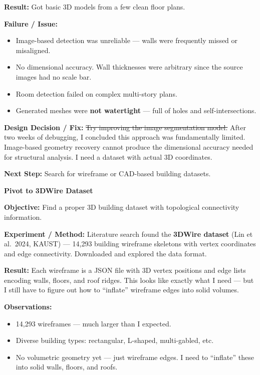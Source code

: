 \documentclass[11pt, letterpaper]{article}
\newcounter{entrynum}
\newcommand{\entry}[2]{%
  \refstepcounter{entrynum}%
  \vspace{6mm}%
  \noindent\begin{tcolorbox}[
    colback=bglight, colframe=entryblue,
    boxrule=1pt, arc=3pt,
    title={\textbf{Entry \theentrynum}\hfill\textbf{#1}},
    fonttitle=\large\color{white},
    colbacktitle=entryblue,
    left=3mm, right=3mm, top=2mm, bottom=2mm
  ]
  {\large\bfseries\color{entryblue} #2}
  \end{tcolorbox}
  \vspace{-1mm}%
}
\newcommand{\objective}{\par\textbf{\color{entryblue}Objective:} }
\newcommand{\experiment}{\par\textbf{\color{entryblue}Experiment / Method:} }
\newcommand{\result}{\par\textbf{\color{entryblue}Result:} }
\newcommand{\failure}{\par\textbf{\color{failred}Failure / Issue:} }
\newcommand{\fix}{\par\textbf{\color{fixgreen}Design Decision / Fix:} }
\newcommand{\nextstep}{\par\textbf{\color{notegray}Next Step:} }
\newcommand{\obs}{\par\textbf{\color{entryblue}Observations:} }
\begin{document}
\result
Got basic 3D models from a few clean floor plans.

\failure
\begin{itemize}[nosep]
  \item Image-based detection was unreliable --- walls were frequently missed
    or misaligned.
  \item No dimensional accuracy. Wall thicknesses were arbitrary since the
    source images had no scale bar.
  \item Room detection failed on complex multi-story plans.
  \item Generated meshes were \textbf{not watertight} --- full of holes and
    self-intersections.
\end{itemize}

\fix
\sout{Try improving the image segmentation model.} After two weeks of
debugging, I concluded this approach was fundamentally limited. Image-based
geometry recovery cannot produce the dimensional accuracy needed for structural
analysis. I need a dataset with actual 3D coordinates.

\nextstep
Search for wireframe or CAD-based building datasets.

\entry{January 4, 2026}{Pivot to 3DWire Dataset}

\objective
Find a proper 3D building dataset with topological connectivity information.

\experiment
Literature search found the \textbf{3DWire dataset} (Lin et al.\ 2024, KAUST) ---
14,293 building wireframe skeletons with vertex coordinates and edge connectivity.
Downloaded and explored the data format.

\result
Each wireframe is a JSON file with 3D vertex positions and edge lists encoding
walls, floors, and roof ridges. This looks like exactly what I need --- but I
still have to figure out how to ``inflate'' wireframe edges into solid volumes.

\obs
\begin{itemize}[nosep]
  \item 14,293 wireframes --- much larger than I expected.
  \item Diverse building types: rectangular, L-shaped, multi-gabled, etc.
  \item No volumetric geometry yet --- just wireframe edges. I need to
    ``inflate'' these into solid walls, floors, and roofs.
\end{itemize}
\end{document}
